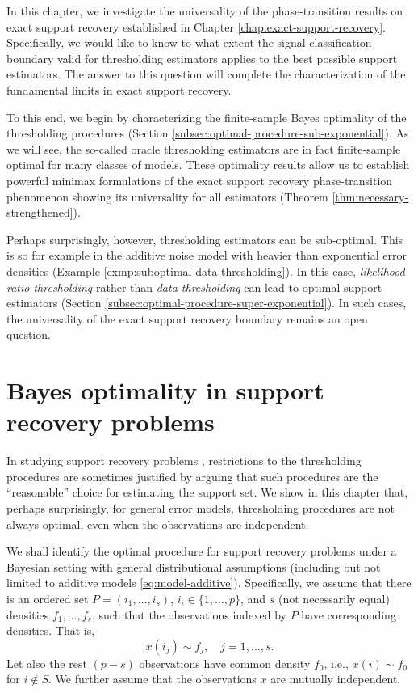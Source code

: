 
In this chapter, we investigate the universality of the phase-transition results on exact support recovery established in
Chapter \ref{chap:exact-support-recovery}.  Specifically, we would like to know to what extent the signal classification 
boundary valid for thresholding estimators applies to the best possible support estimators.  The answer to this question 
will complete the characterization of the fundamental limits in exact support recovery.

To this end, we begin by characterizing the finite-sample Bayes optimality of the thresholding procedures (Section
\ref{subsec:optimal-procedure-sub-exponential}). As we will see, the so-called oracle thresholding estimators are in 
fact finite-sample optimal for many classes of models.  These optimality results allow us to establish 
powerful minimax formulations of the exact support recovery phase-transition phenomenon showing its universality for all estimators (Theorem \ref{thm:necessary-strengthened}). 

Perhaps surprisingly, however, thresholding estimators can be sub-optimal.  This is so for example 
in the additive noise model with heavier than exponential error densities (Example 
\ref{exmp:suboptimal-data-thresholding}).   In this case, {\em likelihood ratio
thresholding} rather than {\em data thresholding} can lead to optimal support estimators
(Section \ref{subsec:optimal-procedure-super-exponential}).  In such cases, the universality 
of the exact support recovery boundary remains an open question. 




\section{Bayes optimality in support recovery problems}
\label{subsec:Bayes-optimality}

In studying support recovery problems \citep[e.g.,][]{arias2017distribution}, restrictions to the thresholding procedures 
are sometimes justified by arguing that such procedures are the ``reasonable'' choice for estimating the support set.
We show in this chapter that, perhaps surprisingly, for general error models, thresholding procedures are not always 
optimal, even when the observations are independent.

We shall identify the optimal procedure for support recovery problems under a Bayesian setting with general distributional assumptions (including but not limited to additive models \eqref{eq:model-additive}).
Specifically, we assume that there is an ordered set $P = (i_1,\ldots,i_s)$, $i_i\in\{1,\ldots,p\}$, and $s$ (not necessarily equal) densities $f_{1}, \ldots, f_{s}$, such that the observations indexed by $P$ have corresponding densities. That is,
\begin{equation} \label{eq:signal-distributions-ordered}
x(i_j) \sim f_j, \quad j=1,\ldots,s.
\end{equation}
Let also the rest $(p-s)$ observations have common density $f_0$, i.e., $x(i)\sim f_0$ for $i\not\in S$.
We further assume that the observations $x$ are mutually independent.

